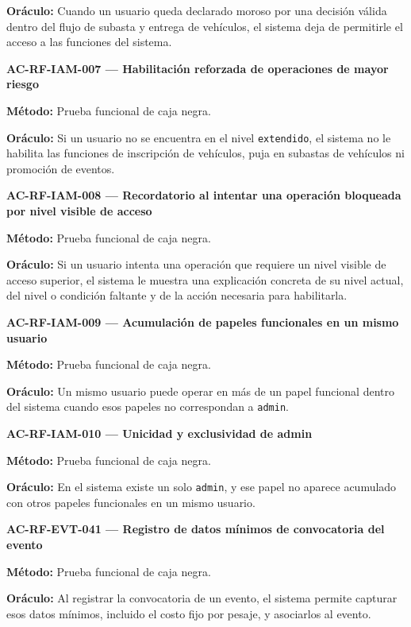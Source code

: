 \documentclass[10pt,letterpaper]{article}
\begin{document}
\textbf{Oráculo:} Cuando un usuario queda declarado moroso por una decisión válida dentro del flujo de subasta y entrega de vehículos, el sistema deja de permitirle el acceso a las funciones del sistema.\par\vspace{0.45em}
\noindent\textbf{AC-RF-IAM-007 --- Habilitación reforzada de operaciones de mayor riesgo}\par
\textbf{Método:} Prueba funcional de caja negra.\par
\textbf{Oráculo:} Si un usuario no se encuentra en el nivel \texttt{extendido}, el sistema no le habilita las funciones de inscripción de vehículos, puja en subastas de vehículos ni promoción de eventos.\par\vspace{0.45em}
\noindent\textbf{AC-RF-IAM-008 --- Recordatorio al intentar una operación bloqueada por nivel visible de acceso}\par
\textbf{Método:} Prueba funcional de caja negra.\par
\textbf{Oráculo:} Si un usuario intenta una operación que requiere un nivel visible de acceso superior, el sistema le muestra una explicación concreta de su nivel actual, del nivel o condición faltante y de la acción necesaria para habilitarla.\par\vspace{0.45em}
\noindent\textbf{AC-RF-IAM-009 --- Acumulación de papeles funcionales en un mismo usuario}\par
\textbf{Método:} Prueba funcional de caja negra.\par
\textbf{Oráculo:} Un mismo usuario puede operar en más de un papel funcional dentro del sistema cuando esos papeles no correspondan a \texttt{admin}.\par\vspace{0.45em}
\noindent\textbf{AC-RF-IAM-010 --- Unicidad y exclusividad de admin}\par
\textbf{Método:} Prueba funcional de caja negra.\par
\textbf{Oráculo:} En el sistema existe un solo \texttt{admin}, y ese papel no aparece acumulado con otros papeles funcionales en un mismo usuario.\par\vspace{0.45em}
\noindent\textbf{AC-RF-EVT-041 --- Registro de datos mínimos de convocatoria del evento}\par
\textbf{Método:} Prueba funcional de caja negra.\par
\textbf{Oráculo:} Al registrar la convocatoria de un evento, el sistema permite capturar esos datos mínimos, incluido el costo fijo por pesaje, y asociarlos al evento.\par\vspace{0.45em}
\end{document}
